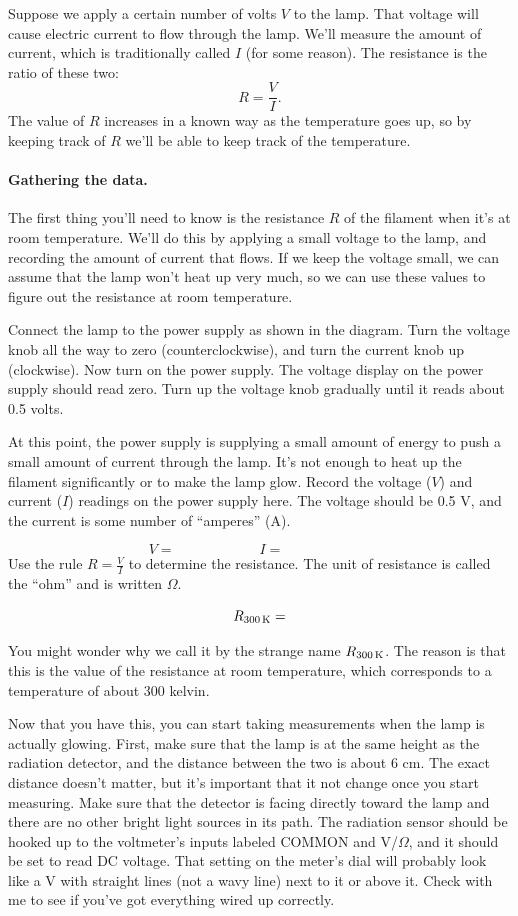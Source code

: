 Suppose we apply a certain number of volts $V$ to the lamp. That voltage
will cause electric current to flow through the lamp. We'll measure
the amount of current, which is traditionally called $I$ (for some reason). 
The resistance is the ratio of these two:
$$
R=\frac{V}{I}.
$$
The value of $R$ increases in a known way as the temperature goes
up, so by keeping track of $R$ we'll be able to keep track of the
temperature.

\pagebreak[3]

\paragraph{Gathering the data.}
The first thing you'll need to know is the resistance $R$ of the filament
when it's at room temperature. We'll do this by applying a small voltage
to the lamp, and recording the amount of current that flows. If we keep
the voltage small, we can assume that the lamp won't heat up very much,
so we can use these values to figure out the resistance at 
room temperature.

Connect the lamp to the power supply as shown in the diagram.
Turn the voltage knob all the way to zero (counterclockwise), and turn
the current knob up (clockwise). Now turn on the power supply.
The voltage display on the power supply should read zero. Turn up the voltage
knob gradually until it reads about 0.5 volts.

At this point, the power supply is supplying a small amount of energy to push
a small amount of current through the lamp. It's not enough to heat up
the filament significantly or to make the lamp glow. 
Record the voltage ($V$) and current ($I$) readings on the power supply here. The voltage 
should be 0.5 V, and the current is some number of ``amperes'' (A).

\answerspace{0.5in}
$$
V=\qquad\qquad\qquad
I = \qquad\qquad\qquad\ 
$$
\answerspace{0.5in}
Use the rule $R=\frac{V}{I}$ to determine the resistance. 
The unit of resistance is called the ``ohm'' and is written $\Omega$.

\answerspace{0.5in}
$$
R_{300\,{\rm K}}=
$$
\answerspace{0.5in}

You might wonder why we call it by the strange name $R_{300\,{\rm K}}$.
The reason is that this is the value of the resistance at room temperature, 
which corresponds to a 
temperature of about 300 kelvin. 

Now that you have this, you can start taking measurements when the lamp
is actually glowing. First, make sure that the lamp is at the same height
as the radiation detector, and the distance between the two is about 6 cm.
The exact distance doesn't matter, but it's important that it not 
change once you start measuring. Make sure that the detector is facing
directly toward the lamp and there are no other bright light sources
in its path. The radiation sensor should be hooked up to the
voltmeter's inputs labeled COMMON and V/$\Omega$, and it should 
be set to read DC voltage. That setting on the meter's dial will
probably look like a V with straight lines (not a wavy line) 
next to it or above it.
Check with me to see if you've got everything wired up correctly.

